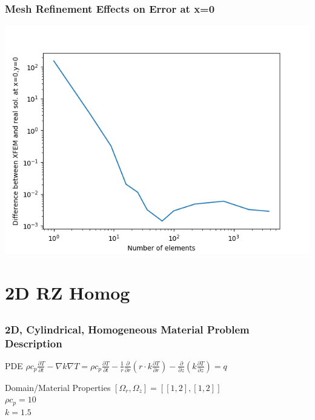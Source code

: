 \documentclass[]{beamer}
\begin{document}
\begin{frame}[t]\frametitle{Mesh Refinement Effects on Error at x=0}
	\begin{center}
		\includegraphics[scale=0.5]{figures/2D_xy_ls1m/2D_xy_ls1mat_neumann_comp}
	\end{center}
\end{frame}

\section{2D RZ Homog}
\subsection{}
\begin{frame}[t]\frametitle{2D, Cylindrical, Homogeneous Material Problem Description}
  \begin{block}{PDE}
    $\rho c_p\frac{\partial T}{\partial t} - \nabla k \nabla T = 
    \rho c_p\frac{\partial T}{\partial t} - \frac{1}{r}\frac{\partial}{\partial r}
    \left(r\cdot k\frac{\partial T}{\partial r}\right) - \frac{\partial}{\partial z}
    \left(k\frac{\partial T}{\partial z}\right)= q$
  \end{block}
  
  \begin{block}{Domain/Material Properties}
  	$[\Omega_r,\Omega_z] = [[1,2],[1,2]]$ \\
  	$\rho c_p = 10$ \\
  	$k=1.5$
  \end{block}
\end{frame}
\end{document}
